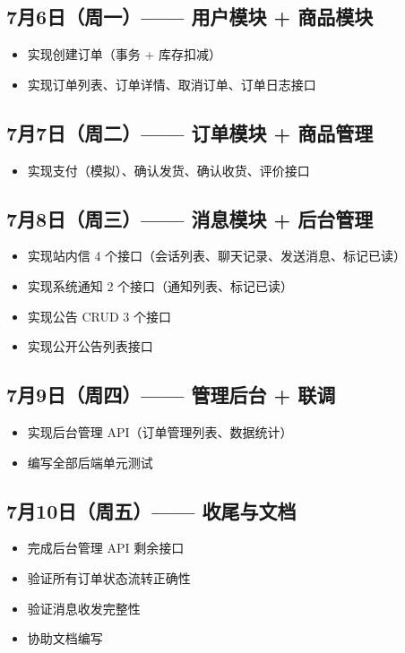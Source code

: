 \documentclass[12pt,a4paper]{ctexart}
\begin{document}
\subsection{7月6日（周一）—— 用户模块 + 商品模块}
\begin{itemize}
    \item 实现创建订单（事务 + 库存扣减）
    \item 实现订单列表、订单详情、取消订单、订单日志接口
\end{itemize}

\subsection{7月7日（周二）—— 订单模块 + 商品管理}
\begin{itemize}
    \item 实现支付（模拟）、确认发货、确认收货、评价接口
\end{itemize}

\subsection{7月8日（周三）—— 消息模块 + 后台管理}
\begin{itemize}
    \item 实现站内信 4 个接口（会话列表、聊天记录、发送消息、标记已读）
    \item 实现系统通知 2 个接口（通知列表、标记已读）
    \item 实现公告 CRUD 3 个接口
    \item 实现公开公告列表接口
\end{itemize}

\subsection{7月9日（周四）—— 管理后台 + 联调}
\begin{itemize}
    \item 实现后台管理 API（订单管理列表、数据统计）
    \item 编写全部后端单元测试
\end{itemize}

\subsection{7月10日（周五）—— 收尾与文档}
\begin{itemize}
    \item 完成后台管理 API 剩余接口
    \item 验证所有订单状态流转正确性
    \item 验证消息收发完整性
    \item 协助文档编写
\end{itemize}
\end{document}
